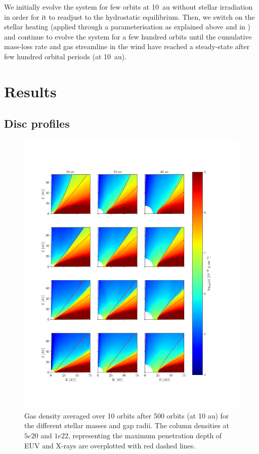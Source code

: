 \documentclass[usenatbib,useAMS,usedcolumn]{mnras}
\begin{document}
We initially evolve the system for few orbits at \SI{10}{au} without stellar irradiation in order for it to readjust to the hydrostatic equilibrium. Then, we switch on the stellar heating (applied through a parameterisation as explained above and in ) and continue to evolve the system for a few hundred orbits until the cumulative mass-loss rate and gas streamline in the wind have reached a steady-state after few hundred orbital periods (at \SI{10}{au}).

\section{Results}\label{sec:results}

\subsection{Disc profiles}

\begin{figure}
   \centering
   \includegraphics[width=\textwidth]{CompHoles}
   \caption{Gas density averaged over 10 orbits after 500 orbits (at 10 au) for the different stellar masses and gap radii. The column densities at $5e20$ and $1e22$, representing the maximum penetration depth of EUV and X-rays are overplotted with red dashed lines. \label{fig:2Ddensdiscs}}
\end{figure}
\end{document}

